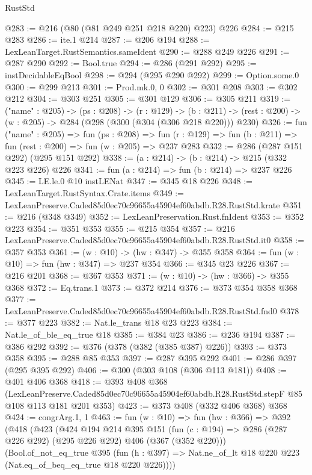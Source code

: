 \begin{lexlean}{RustStd}
\begin{coremodule}
@283 := @216 (@80 (@81 @249 @251 @218 @220) @223) @226
@284 := @215 @283
@286 := ite.{1} @214
@287 := @206 @194
@288 := LexLeanTarget.RustSemantics.sameIdent
@290 := @288 @249 @226
@291 := @287 @290
@292 := Bool.true
@294 := @286 (@291 @292)
@295 := instDecidableEqBool
@298 := @294 (@295 @290 @292)
@299 := Option.some.{0}
@300 := @299 @213
@301 := Prod.mk.{0, 0}
@302 := @301 @208
@303 := @302 @212
@304 := @303 @251
@305 := @301 @129
@306 := @305 @211
@319 := ("name" : @205) ->
  (ps : @208) ->
  (r : @129) ->
  (b : @211) -> (rest : @200) -> (w : @205) -> @284 (@298 (@300 (@304 (@306 @218 @220))) @230)
@326 := fun ("name" : @205) =>
  fun (ps : @208) =>
  fun (r : @129) => fun (b : @211) => fun (rest : @200) => fun (w : @205) => @237 @283
@332 := @286 (@287 @151 @292) (@295 @151 @292)
@338 := (a : @214) -> (b : @214) -> @215 (@332 @223 @226) @226
@341 := fun (a : @214) => fun (b : @214) => @237 @226
@345 := LE.le.{0} @10 instLENat
@347 := @345 @18 @226
@348 := LexLeanTarget.RustSyntax.Crate.items
@349 := LexLeanPreserve.Caded85d0ec70c96655a45904ef60abdb.R28.RustStd.krate
@351 := @216 (@348 @349)
@352 := LexLeanPreservation.Rust.fnIdent
@353 := @352 @223
@354 := @351 @353
@355 := @215 @354
@357 := @216 LexLeanPreserve.Caded85d0ec70c96655a45904ef60abdb.R28.RustStd.it0
@358 := @357 @353
@361 := (w : @10) -> (hw : @347) -> @355 @358
@364 := fun (w : @10) => fun (hw : @347) => @237 @354
@366 := @345 @23 @226
@367 := @216 @201
@368 := @367 @353
@371 := (w : @10) -> (hw : @366) -> @355 @368
@372 := Eq.trans.{1}
@373 := @372 @214
@376 := @373 @354 @358 @368
@377 := LexLeanPreserve.Caded85d0ec70c96655a45904ef60abdb.R28.RustStd.fnd0
@378 := @377 @223
@382 := Nat.le_trans @18 @23 @223
@384 := Nat.le_of_ble_eq_true @18
@385 := @384 @23
@386 := @236 @194
@387 := @386 @292
@392 := @376 (@378 (@382 (@385 @387) @226))
@393 := @373 @358
@395 := @288 @85 @353
@397 := @287 @395 @292
@401 := @286 @397 (@295 @395 @292)
@406 := @300 (@303 @108 (@306 @113 @181))
@408 := @401 @406 @368
@418 := @393
    @408
    @368
    (LexLeanPreserve.Caded85d0ec70c96655a45904ef60abdb.R28.RustStd.stepF
      @85
      @108
      @113
      @181
      @201
      @353)
@423 := @373 @408 (@332 @406 @368) @368
@424 := congrArg.{1, 1}
@463 := fun (w : @10) =>
  fun (hw : @366) =>
  @392
    (@418
      (@423
        (@424
          @194
          @214
          @395
          @151
          (fun (c : @194) => @286 (@287 @226 @292) (@295 @226 @292) @406 (@367 (@352 @220)))
          (Bool.of_not_eq_true
            @395
            (fun (h : @397) => Nat.ne_of_lt @18 @220 @223 (Nat.eq_of_beq_eq_true @18 @220 @226))))

\end{coremodule}
\end{lexlean}
